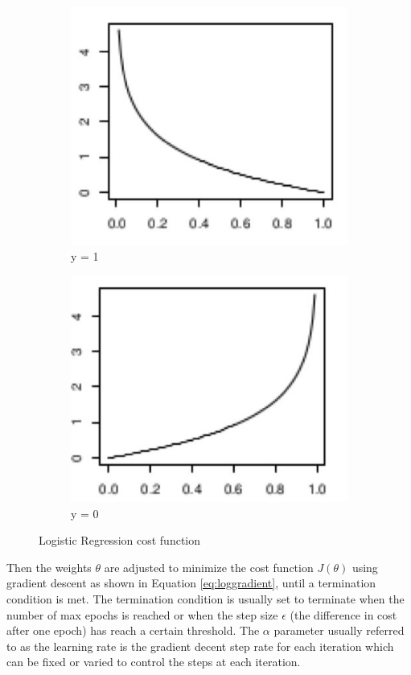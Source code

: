 \begin{figure}[H]
\centering
  \begin{subfigure}[b]{0.35\textwidth}
    \includegraphics[scale = 0.5]{imgs/logistic_cost_1.JPG}
    \caption{y = 1}
    \label{fig:log_cost_1}
  \end{subfigure}
  \begin{subfigure}[b]{0.35\textwidth}
    \includegraphics[scale = 0.52]{imgs/logistic_cost_2.JPG}
    \caption{y = 0}
    \label{fig:log_cost_2}
  \end{subfigure}
  \caption{Logistic Regression cost function}
  \label{fig:log_cost_0_1}
\end{figure}
\noindent Then the weights \(\theta\) are adjusted to minimize the cost function \(J(\theta)\) using gradient descent as shown in Equation \eqref{eq:loggradient}, until a termination condition is met. The termination condition is usually set to terminate when the number of max epochs is reached or when the step size \(\epsilon\) (the difference in cost after one epoch) has reach a certain threshold. The \(\alpha\) parameter usually referred to as the learning rate is the gradient decent step rate for each iteration which can be fixed or varied to control the steps at each iteration.   
